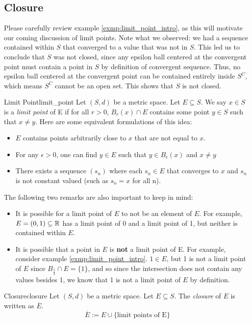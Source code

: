 




\subsection{Closure}
Please carefully review example \ref{exmp:limit_point_intro}, as this will motivate our coming discussion of limit points. Note what we observed: we had a sequence contained within \(S\) that converged to a value that was not in \(S\). This led us to conclude that \(S\) was not closed, since any epsilon ball centered at the convergent point must contain a point in \(S\) by definition of convergent sequence. Thus, no epsilon ball centered at the convergent point can be contained entirely inside \(S^C\), which means \(S^C\) cannot be an open set. This shows that \(S\) is not closed. 
\begin{defn}{Limit Point}{limit_point}
Let \((S, d)\) be a metric space. Let \(E \subseteq S\). We say \(x \in S\) is a \textit{limit point} of E if for all \(r > 0\), \(B_r(x) \cap E\) contains some point \(y \in S\) such that \(x \not = y\). Here are some equivalent formulations of this idea:
	\begin{itemize}
  		\item \(E\) contains points arbitrarily close to \(x\) that are not equal to \(x\).  
  		\item For any \(\epsilon > 0\), one can find \(y \in E\) such that \(y \in B_{\epsilon}(x)\) and \(x \not = y\)
  		\item There exists a sequence \((s_n)\) where each \(s_n \in E\) that converges to \(x\) and \(s_n\) is not constant valued (such as \(s_n = x\) for all n).
	\end{itemize}
The following two remarks are also important to keep in mind: 
\begin{itemize}
  \item It is possible for a limit point of \(E\) to not be an element of \(E\). For example, \(E = (0, 1) \subseteq {\mathbb R}\) has a limit point of 0 and a limit point of 1, but neither is contained within \(E\).
  \item It is possible that a point in \(E\) is \textbf{not} a limit point of E. For example, consider example \ref{exmp:limit_point_intro}. \(1 \in E\), but 1 is not a limit point of \(E\) since \(B_{\frac{1}{4}} \cap E = \{1\}\), and so since the intersection does not contain any values besides 1, we know that 1 is not a limit point of \(E\) by definition. 
\end{itemize}


\end{defn}
\begin{defn}{Closure}{closure}
Let \((S, d)\) be a metric space. Let \(E \subseteq S\). The \textit{closure} of \(E\) is written as \(\overline{E}\). 
\begin{equation*}
  \overline{E} := E \cup \{\textrm{limit points of E}\}
\end{equation*}

\end{defn}


